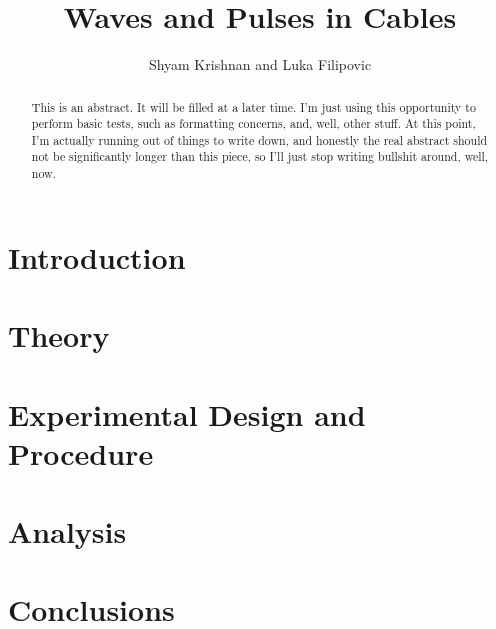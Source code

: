 \documentclass[letterpaper, 10pt, conference]{ieeeconf}
\title{\LARGE \bf Waves and Pulses in Cables}
\author{Shyam Krishnan and Luka Filipovic}
\numberwithin{equation}{section}
\begin{document}
\maketitle
\thispagestyle{empty}
\pagestyle{empty}

\begin{abstract}
This is an abstract. It will be filled at a later time. I'm just using this opportunity to perform basic tests, such as formatting concerns, and, well, other stuff. At this point, I'm actually running out of things to write down, and honestly the real abstract should not be significantly longer than this piece, so I'll just stop writing bullshit around, well, now.
\end{abstract}

\section{Introduction}


\section{Theory\label{sec:theory}}


\section{Experimental Design and Procedure}


\section{Analysis}


\section{Conclusions}


\printbibliography
\end{document}
